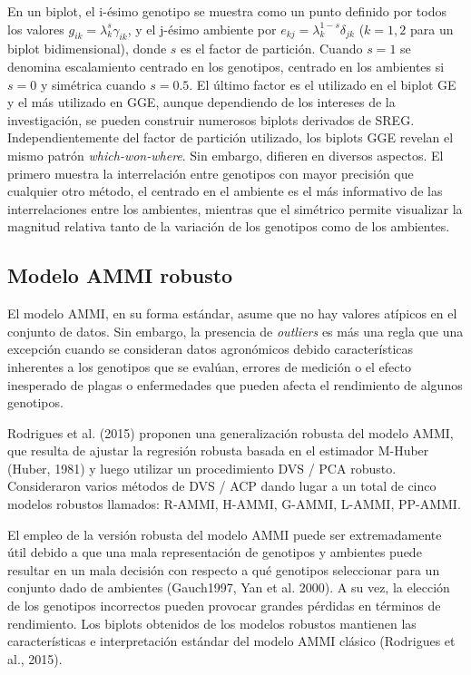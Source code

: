 En un biplot, el i-ésimo genotipo se muestra como un punto definido por todos los valores $g_{ik} = \lambda_k^{s} \gamma_{ik}$, y el j-ésimo ambiente por $e_{kj} = \lambda_k^{1-s} \delta_{jk}$ ($k=1,2$ para un biplot bidimensional), donde $s$ es el factor de partición. Cuando $s=1$ se denomina escalamiento centrado en los genotipos, centrado en los ambientes si $s=0$ y simétrica cuando $s=0.5$. El último factor es el utilizado en el biplot GE y el más utilizado en GGE, aunque dependiendo de los intereses de la investigación, se pueden construir numerosos biplots derivados de SREG. Independientemente del factor de partición utilizado, los biplots GGE revelan el mismo patrón \emph{which-won-where}. Sin embargo, difieren en diversos aspectos. El primero muestra la interrelación entre genotipos con mayor precisión que cualquier otro método, el centrado en el ambiente es el más informativo de las interrelaciones entre los ambientes, mientras que el simétrico permite visualizar la magnitud relativa tanto de la variación de los genotipos como de los ambientes. 



\subsection{Modelo AMMI robusto}

El modelo AMMI, en su forma estándar, asume que no hay valores atípicos en el conjunto de datos. Sin embargo, la presencia de \emph{outliers} es más una regla que una excepción cuando se consideran datos agronómicos debido características inherentes a los genotipos que se evalúan, errores de medición o el efecto inesperado de plagas o enfermedades que pueden afecta el rendimiento de algunos genotipos.

Rodrigues et al. (2015) proponen una generalización robusta del modelo AMMI, que resulta de ajustar la regresión robusta basada en el estimador M-Huber (Huber, 1981) y luego utilizar un procedimiento DVS / PCA robusto. Consideraron varios métodos de DVS / ACP dando lugar a un total de cinco modelos robustos llamados: R-AMMI, H-AMMI, G-AMMI, L-AMMI, PP-AMMI. 

El empleo de la versión robusta del modelo AMMI puede ser extremadamente útil debido a que una mala representación de genotipos y ambientes puede resultar en un mala decisión con respecto a qué genotipos seleccionar para un conjunto dado de ambientes (Gauch1997, Yan et al. 2000). A su vez, la elección de los genotipos incorrectos pueden provocar grandes pérdidas en términos de rendimiento. Los biplots obtenidos de los modelos robustos mantienen las características e interpretación estándar del modelo AMMI clásico (Rodrigues et al., 2015).


